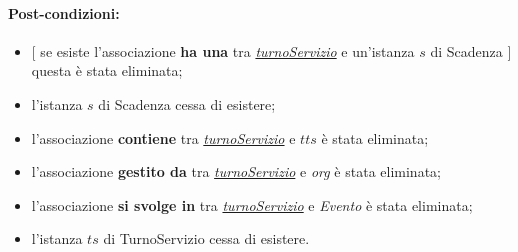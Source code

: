 \paragraph{Post-condizioni:} 
\begin{itemize}
    \item $[$ se esiste l'associazione \textbf{ha una} tra \underline{\textit{turnoServizio}} e un'istanza $s$ di Scadenza $]$ questa è stata eliminata;
 \item l'istanza $s$ di Scadenza cessa di esistere;
  \item l'associazione \textbf{contiene} tra \underline{\textit{turnoServizio}} e $tts$ è stata eliminata;
 \item l'associazione \textbf{gestito da} tra \underline{\textit{turnoServizio}} e \textit{org} è stata eliminata;
\item l'associazione \textbf{si svolge in} tra \underline{\textit{turnoServizio}} e \textit{Evento} è stata eliminata;
 \item l'istanza $ts$ di TurnoServizio cessa di esistere.
\end{itemize}
